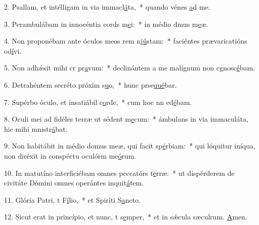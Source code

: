 2. Psallam, et intélligam in via immacl\uline{á}ta,~* quando vénes \uline{a}d me.\par 
3. Perambulábam in innocéntia cords m\uline{e}i:~* in médio dmus m\uline{e}æ.\par 
4. Non proponébam ante óculos meos rem nj\uline{ú}stam:~* faciéntes prævaricatións od\uline{í}vi.\par 
5. Non adhǽsit mihi cr pr\uline{a}vum:~* declinántem a me malígnum non cgnosc\uline{é}bam.\par 
6. Detrahéntem secréto próxim s\uline{u}o,~* hunc prse\uline{qué}bar.\par 
7. Supérbo óculo, et insatiábil c\uline{o}rde,~* cum hoc nn ed\uline{é}bam.\par 
8. Oculi mei ad fidéles terræ ut sédent m\uline{e}cum:~* ámbulans in via immaculáta, hic mihi mnistr\uline{á}bat.\par 
9. Non habitábit in médio domus meæ, qui facit sp\uline{é}rbiam:~* qui lóquitur iníqua, non diréxit in conspéctu oculórm me\uline{ó}rum.\par 
10. In matutíno interficiébam omnes peccatórs t\uline{e}rræ:~* ut dispérderem de civitáte Dómini omnes operántes inquit\uline{á}tem.\par 
11. Glória Patri, t F\uline{í}lio,~* et Spiríti S\uline{a}ncto.\par 
12. Sicut erat in princípio, et nunc, t s\uline{e}mper,~* et in sǽcula sæculrum. \uline{A}men.\par 
